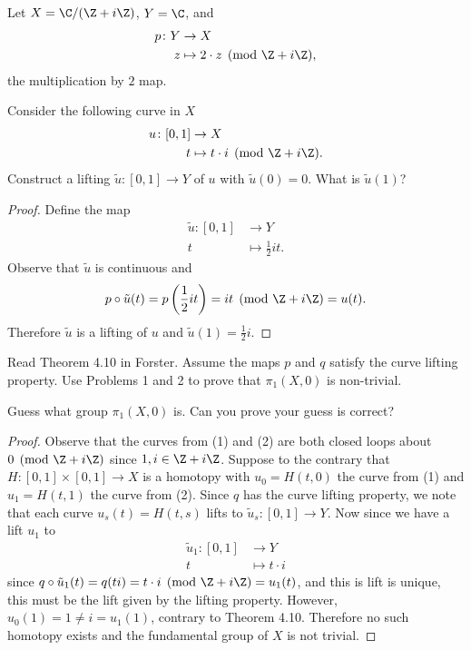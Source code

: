 \documentclass[10pt]{amsart}
\begin{document}
\begin{thm}
  Let $X = \C/(\Z + i\Z)$, $Y = \C$, and 
  \begin{align*}
    p \colon Y & \rightarrow X\\
    z & \mapsto 2 \cdot z \pmod{\Z + i\Z},
  \end{align*}
  the multiplication by $2$ map.
  
  Consider the following curve in $X$
  \begin{align*}
    u \colon [0,1] & \rightarrow X\\
    t & \mapsto t \cdot i \pmod{\Z + i\Z}.
  \end{align*}
  Construct a lifting $\tilde{u} \colon [0,1] \rightarrow Y$ of $u$ with $\tilde{u}(0) = 0$.
  What is $\tilde{u}(1)$?
  
  \begin{proof}
    Define the map
    \begin{align*}
      \tilde{u} \colon [0,1] & \rightarrow Y\\
      t & \mapsto \frac{1}{2}it.
    \end{align*}
    Observe that $\tilde{u}$ is continuous and 
    $$p \circ \tilde{u}(t) = p\left(\frac{1}{2}it\right) = it \pmod{\Z + i\Z} = u(t).$$
    Therefore $\tilde{u}$ is a lifting of $u$ and $\tilde{u}(1) = \frac{1}{2}i$.
    
  \end{proof}
\end{thm}

\begin{thm}
  Read Theorem 4.10 in Forster.
  Assume the maps $p$ and $q$ satisfy the curve lifting property.
  Use Problems 1 and 2 to prove that $\pi_1(X, 0)$ is non-trivial.
  
  Guess what group $\pi_1(X, 0)$ is.
  Can you prove your guess is correct?
  
  \begin{proof}
    Observe that the curves from (1) and (2) are both closed loops about $0 \pmod{\Z + i\Z}$ since $1, i \in \Z + i\Z$.
    Suppose to the contrary that $H \colon [0,1] \times [0,1] \rightarrow X$ is a homotopy with $u_0 = H(t,0)$ the curve from (1) and $u_1 = H(t,1)$ the curve from (2).
    Since $q$ has the curve lifting property, we note that each curve $u_s(t) = H(t,s)$ lifts to $\tilde{u}_s \colon [0,1] \rightarrow Y$.
    Now since we have a lift $u_1$ to 
    \begin{align*}
      \tilde{u}_1 \colon [0,1] & \rightarrow Y\\
      t & \mapsto t \cdot i
    \end{align*}
    since $q \circ \tilde{u}_1(t) = q(ti) = t \cdot i \pmod{\Z + i\Z} = u_1(t)$, and this is lift is unique, this must be the lift given by the lifting property.
    However, $u_0(1) = 1 \neq i = u_1(1)$, contrary to Theorem 4.10.
    Therefore no such homotopy exists and the fundamental group of $X$ is not trivial.
  \end{proof}
\end{thm}
\end{document}
